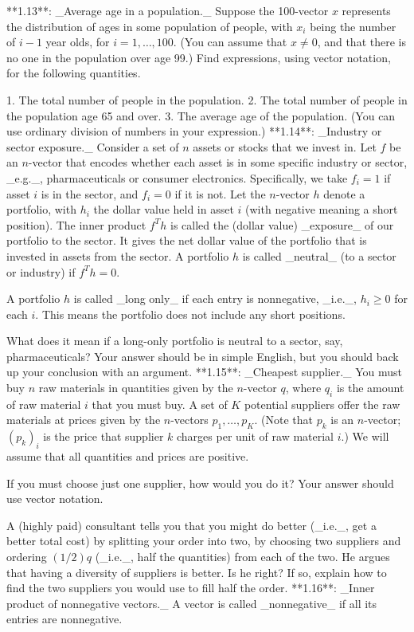 

**1.13**: _Average age in a population._ Suppose the 100-vector \(x\) represents the distribution of ages in some population of people, with \(x_{i}\) being the number of \(i-1\) year olds, for \(i=1,\ldots,100\). (You can assume that \(x\neq 0\), and that there is no one in the population over age 99.) Find expressions, using vector notation, for the following quantities.

1. The total number of people in the population. 2. The total number of people in the population age 65 and over. 3. The average age of the population. (You can use ordinary division of numbers in your expression.)
**1.14**: _Industry or sector exposure._ Consider a set of \(n\) assets or stocks that we invest in. Let \(f\) be an \(n\)-vector that encodes whether each asset is in some specific industry or sector, _e.g._, pharmaceuticals or consumer electronics. Specifically, we take \(f_{i}=1\) if asset \(i\) is in the sector, and \(f_{i}=0\) if it is not. Let the \(n\)-vector \(h\) denote a portfolio, with \(h_{i}\) the dollar value held in asset \(i\) (with negative meaning a short position). The inner product \(f^{T}h\) is called the (dollar value) _exposure_ of our portfolio to the sector. It gives the net dollar value of the portfolio that is invested in assets from the sector. A portfolio \(h\) is called _neutral_ (to a sector or industry) if \(f^{T}h=0\).

A portfolio \(h\) is called _long only_ if each entry is nonnegative, _i.e._, \(h_{i}\geq 0\) for each \(i\). This means the portfolio does not include any short positions.

What does it mean if a long-only portfolio is neutral to a sector, say, pharmaceuticals? Your answer should be in simple English, but you should back up your conclusion with an argument.
**1.15**: _Cheapest supplier._ You must buy \(n\) raw materials in quantities given by the \(n\)-vector \(q\), where \(q_{i}\) is the amount of raw material \(i\) that you must buy. A set of \(K\) potential suppliers offer the raw materials at prices given by the \(n\)-vectors \(p_{1},\ldots,p_{K}\). (Note that \(p_{k}\) is an \(n\)-vector; \((p_{k})_{i}\) is the price that supplier \(k\) charges per unit of raw material \(i\).) We will assume that all quantities and prices are positive.

If you must choose just one supplier, how would you do it? Your answer should use vector notation.

A (highly paid) consultant tells you that you might do better (_i.e._, get a better total cost) by splitting your order into two, by choosing two suppliers and ordering \((1/2)q\) (_i.e._, half the quantities) from each of the two. He argues that having a diversity of suppliers is better. Is he right? If so, explain how to find the two suppliers you would use to fill half the order.
**1.16**: _Inner product of nonnegative vectors._ A vector is called _nonnegative_ if all its entries are nonnegative.

